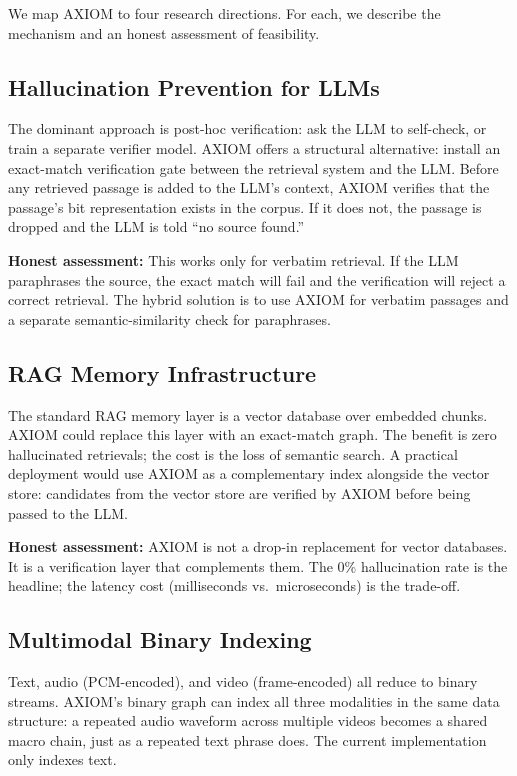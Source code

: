 \documentclass[conference]{IEEEtran}
\begin{document}
We map AXIOM to four research directions. For each, we describe the mechanism and an honest assessment of feasibility.

\subsection{Hallucination Prevention for LLMs}

The dominant approach is post-hoc verification: ask the LLM to self-check, or train a separate verifier model. AXIOM offers a structural alternative: install an exact-match verification gate between the retrieval system and the LLM. Before any retrieved passage is added to the LLM's context, AXIOM verifies that the passage's bit representation exists in the corpus. If it does not, the passage is dropped and the LLM is told ``no source found.''

\textbf{Honest assessment:} This works only for verbatim retrieval. If the LLM paraphrases the source, the exact match will fail and the verification will reject a correct retrieval. The hybrid solution is to use AXIOM for verbatim passages and a separate semantic-similarity check for paraphrases.

\subsection{RAG Memory Infrastructure}

The standard RAG memory layer is a vector database over embedded chunks. AXIOM could replace this layer with an exact-match graph. The benefit is zero hallucinated retrievals; the cost is the loss of semantic search. A practical deployment would use AXIOM as a complementary index alongside the vector store: candidates from the vector store are verified by AXIOM before being passed to the LLM.

\textbf{Honest assessment:} AXIOM is not a drop-in replacement for vector databases. It is a verification layer that complements them. The 0\% hallucination rate is the headline; the latency cost (milliseconds vs.\ microseconds) is the trade-off.

\subsection{Multimodal Binary Indexing}

Text, audio (PCM-encoded), and video (frame-encoded) all reduce to binary streams. AXIOM's binary graph can index all three modalities in the same data structure: a repeated audio waveform across multiple videos becomes a shared macro chain, just as a repeated text phrase does. The current implementation only indexes text.
\end{document}

